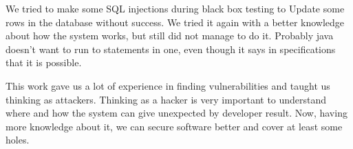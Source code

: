 We tried to make some SQL injections during black box testing to Update some rows in the database without success. We tried it again with a better knowledge about how the system works, but still did not manage to do it. Probably java doesn’t want to run to statements in one, even though it says in specifications that it is possible.


This work gave us a lot of experience in finding vulnerabilities and taught us thinking as attackers. Thinking as a hacker is very important to understand where and how the system can give unexpected by developer result. Now, having more knowledge about it, we can secure software better and cover at least some holes.